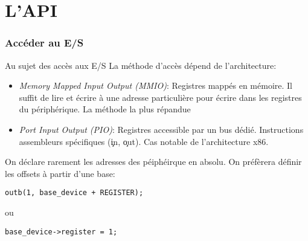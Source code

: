 %
%
%

\part{L'API}

\section{Accéder au E/S}

\begin{frame}[fragile=singleslide]{Au sujet des accès aux E/S}
  La méthode d'accès dépend de l'architecture:
  \begin{itemize} 
  \item \emph{Memory Mapped Input  Output (MMIO)}: Registres mappés en
    mémoire.  Il suffit  de lire et écrire à  une adresse particulière
    pour écrire dans les registres du périphérique. La méthode la plus
    répandue
  \item \emph{Port  Input Output  (PIO)}: Registres accessible  par un
    bus   dédié.    Instructions   assembleurs  spécifiques   (\c{in},
    \c{out}).  Cas notable de l'architecture x86.
  \end{itemize}

  On  déclare rarement  les  adresses des  péiphéirque  en absolu.  On
  préfèrera définir les offsets à partir d'une base:
  \begin{lstlisting}
outb(1, base_device + REGISTER);
  \end{lstlisting} 
  ou 
  \begin{lstlisting}
base_device->register = 1;
  \end{lstlisting} 
\end{frame}

